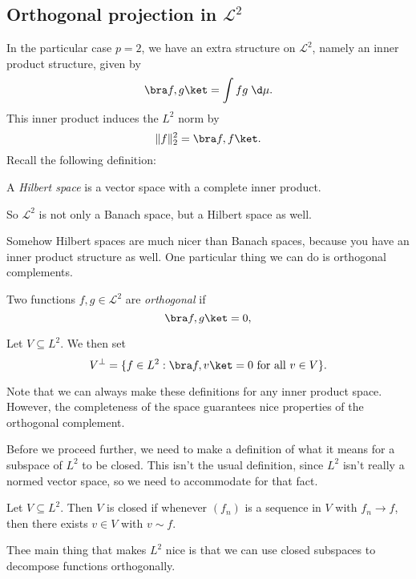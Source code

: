 \documentclass[a4paper]{article}
\begin{document}
\subsection{Orthogonal projection in \texorpdfstring{$\mathcal{L}^2$}{L2}}
In the particular case $p = 2$, we have an extra structure on $\mathcal{L}^2$, namely an inner product structure, given by
\[
  \bra f, g\ket = \int fg\;\d \mu.
\]
This inner product induces the $L^2$ norm by
\[
  \|f\|_2^2 = \bra f, f\ket.
\]
Recall the following definition:
\begin{defi}
  A \emph{Hilbert space} is a vector space with a complete inner product.
\end{defi}
So $\mathcal{L}^2$ is not only a Banach space, but a Hilbert space as well.

Somehow Hilbert spaces are much nicer than Banach spaces, because you have an inner product structure as well. One particular thing we can do is orthogonal complements.

\begin{defi}
  Two functions $f, g \in \mathcal{L}^2$ are \emph{orthogonal} if
  \[
    \bra f, g\ket = 0,
  \]
\end{defi}

\begin{defi}
  Let $V \subseteq L^2$. We then set
  \[
    V^\perp = \{f \in L^2: \bra f, v \ket = 0\text{ for all }v \in V\}.
  \]
\end{defi}

Note that we can always make these definitions for any inner product space. However, the completeness of the space guarantees nice properties of the orthogonal complement.

Before we proceed further, we need to make a definition of what it means for a subspace of $L^2$ to be closed. This isn't the usual definition, since $L^2$ isn't really a normed vector space, so we need to accommodate for that fact.

\begin{defi}
  Let $V \subseteq L^2$. Then $V$ is closed if whenever $(f_n)$ is a sequence in $V$ with $f_n \to f$, then there exists $v \in V$ with $v \sim f$.
\end{defi}

Thee main thing that makes $L^2$ nice is that we can use closed subspaces to decompose functions orthogonally.
\end{document}
